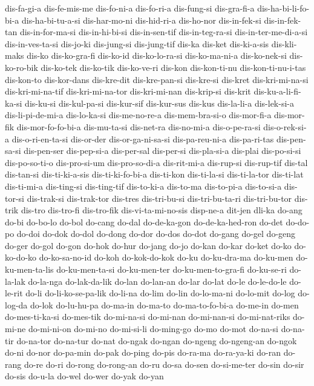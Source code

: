 {dis-fa-gi-a dis-fe-mis-me dis-fo-ni-a dis-fo-ri-a dis-fung-si dis-gra-fi-a
dis-ha-bi-li-fo-bi-a dis-ha-bi-tu-a-si dis-har-mo-ni dis-hid-ri-a
dis-ho-nor dis-in-fek-si dis-in-fek-tan dis-in-for-ma-si dis-in-hi-bi-si
dis-in-sen-tif dis-in-teg-ra-si dis-in-ter-me-di-a-si dis-in-ves-ta-si
dis-jo-ki dis-jung-si dis-jung-tif dis-ka dis-ket dis-ki-a-sis
dis-kli-maks dis-ko dis-ko-gra-fi dis-ko-id dis-ko-lo-ra-si dis-ko-ma-ni-a
dis-ko-nek-si dis-ko-ro-bik dis-ko-tek dis-ko-tik dis-ko-ve-ri dis-kon
dis-kon-ti-nu dis-kon-ti-nu-i-tas dis-kon-to dis-kor-dans dis-kre-dit
dis-kre-pan-si dis-kre-si dis-kret dis-kri-mi-na-si dis-kri-mi-na-tif
dis-kri-mi-na-tor dis-kri-mi-nan dis-krip-si dis-krit dis-ku-a-li-fi-ka-si
dis-ku-si dis-kul-pa-si dis-kur-sif dis-kur-sus dis-kus dis-la-li-a
dis-lek-si-a dis-li-pi-de-mi-a dis-lo-ka-si dis-me-no-re-a
dis-mem-bra-si-o dis-mor-fi-a dis-mor-fik dis-mor-fo-fo-bi-a dis-mu-ta-si
dis-net-ra dis-no-mi-a dis-o-pe-ra-si dis-o-rek-si-a dis-o-ri-en-ta-si
dis-or-der dis-or-ga-ni-sa-si dis-pa-reu-ni-a dis-pa-ri-tas dis-pen-sa-si
dis-pen-ser dis-pep-si-a dis-per-sal dis-per-si dis-pla-si-a dis-plai
dis-po-si-si dis-po-so-ti-o dis-pro-si-um dis-pro-so-di-a dis-rit-mi-a
dis-rup-si dis-rup-tif dis-tal dis-tan-si dis-ti-ki-a-sis
dis-ti-ki-fo-bi-a dis-ti-kon dis-ti-la-si dis-ti-la-tor dis-ti-lat
dis-ti-mi-a dis-ting-si dis-ting-tif dis-to-ki-a dis-to-ma dis-to-pi-a
dis-to-si-a dis-tor-si dis-trak-si dis-trak-tor dis-tres dis-tri-bu-si
dis-tri-bu-ta-ri dis-tri-bu-tor dis-trik dis-tro dis-tro-fi dis-tro-fik
dis-vi-ta-mi-no-sis disp-ne-a dit-jen dli-ka do-ang do-bi do-bo-lo do-bol
do-cang do-dal do-de-ka-gon do-de-ka-hed-ron do-det do-do-po do-doi do-dok
do-dol do-dong do-dor do-dos do-dot do-gang do-gel do-geng do-ger do-gol
do-gon do-hok do-hur do-jang do-jo do-kan do-kar do-ket do-ko do-ko-do-ko
do-ko-sa-no-id do-koh do-kok-do-kok do-ku do-ku-dra-ma do-ku-men
do-ku-men-ta-lis do-ku-men-ta-si do-ku-men-ter do-ku-men-to-gra-fi
do-ku-se-ri do-la-lak do-la-nga do-lak-da-lik do-lan do-lan-an do-lar
do-lat do-le do-le-do-le do-le-rit do-li do-li-ko-se-pa-lik do-li-na
do-lim do-lin do-lo-ma-ni do-lo-mit do-log do-log-da do-lok do-lu-hu-pa
do-ma-in do-ma-to do-ma-to-fo-bi-a do-me-in do-men do-mes-ti-ka-si
do-mes-tik do-mi-na-si do-mi-nan do-mi-nan-si do-mi-nat-riks do-mi-ne
do-mi-ni-on do-mi-no do-mi-si-li do-ming-go do-mo do-mot do-na-si
do-na-tir do-na-tor do-na-tur do-nat do-ngak do-ngan do-ngeng do-ngeng-an
do-ngok do-ni do-nor do-pa-min do-pak do-ping do-pis do-ra-ma do-ra-ya-ki
do-ran do-rang do-re do-ri do-rong do-rong-an do-ru do-sa do-sen
do-si-me-ter do-sin do-sir do-sis do-u-la do-wel do-wer do-yak do-yan
}
